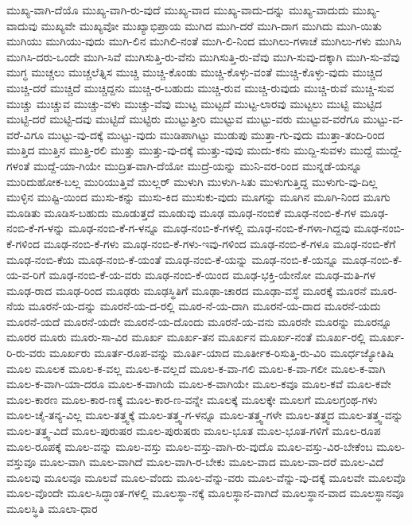 {ಮುಖ್ಯ-ವಾಗಿ-ದೆಯೊ
ಮುಖ್ಯ-ವಾಗಿ-ರು-ವುದೆ
ಮುಖ್ಯ-ವಾದ
ಮುಖ್ಯ-ವಾದು-ದನ್ನು
ಮುಖ್ಯ-ವಾದುದು
ಮುಖ್ಯ-ವಾದುವು
ಮುಖ್ಯವೇ
ಮುಖ್ಯವೋ
ಮುಖ್ಯಾಭಿಪ್ರಾಯ
ಮುಗಿದ
ಮುಗಿ-ದರೆ
ಮುಗಿ-ದಾಗ
ಮುಗಿದು
ಮುಗಿ-ಯಿತು
ಮುಗಿಯು
ಮುಗಿಯು-ವುದು
ಮುಗಿ-ಲಿನ
ಮುಗಿಲಿ-ನಂತೆ
ಮುಗಿ-ಲಿ-ನಿಂದ
ಮುಗಿಲು-ಗಳಾಚೆ
ಮುಗಿಲು-ಗಳು
ಮುಗಿಸಿ
ಮುಗಿಸಿ-ದರು-ಒಂದೇ
ಮುಗಿ-ಸಿವೆ
ಮುಗಿಸುತ್ತಿ-ರು-ವೆನು
ಮುಗಿಸುತ್ತಿ-ರು-ವೆವು
ಮುಗಿ-ಸುವು-ದಕ್ಕಾಗಿ
ಮುಗಿ-ಸು-ವೆವು
ಮುಗ್ಧ
ಮುಚ್ಚಲು
ಮುಚ್ಚಲೆತ್ನಿಸ
ಮುಚ್ಚಿ
ಮುಚ್ಚಿ-ಕೊಂಡು
ಮುಚ್ಚಿ-ಕೊಳ್ಳು-ವಂತೆ
ಮುಚ್ಚಿ-ಕೊಳ್ಳು-ವುದು
ಮುಚ್ಚಿದ
ಮುಚ್ಚಿ-ದರೆ
ಮುಚ್ಚಿದೆ
ಮುಚ್ಚಿದ್ದನು
ಮುಚ್ಚಿ-ರ-ಬಹುದು
ಮುಚ್ಚಿ-ರುವ
ಮುಚ್ಚಿ-ರುವುದು
ಮುಚ್ಚಿ-ರುವೆ
ಮುಚ್ಚಿ-ಸುವ
ಮುಚ್ಚು
ಮುಚ್ಚುವ
ಮುಚ್ಚು-ವಳು
ಮುಚ್ಚು-ವೆವು
ಮುಟ್ಟ
ಮುಟ್ಟದೆ
ಮುಟ್ಟ-ಲಾರವು
ಮುಟ್ಟಲು
ಮುಟ್ಟಿ
ಮುಟ್ಟಿದ
ಮುಟ್ಟಿ-ದರೆ
ಮುಟ್ಟಿ-ದವು
ಮುಟ್ಟಿದೆ
ಮುಟ್ಟಿರು
ಮುಟ್ಟುತ್ತೀರಿ
ಮುಟ್ಟುವ
ಮುಟ್ಟು-ವರು
ಮುಟ್ಟುವ-ವರೆಗೂ
ಮುಟ್ಟು-ವ-ವರೆ-ವಿಗೂ
ಮುಟ್ಟು-ವು-ದಕ್ಕೆ
ಮುಟ್ಟು-ವುದು
ಮುಡಿಪಾಗಿಟ್ಟು
ಮುಡುಪು
ಮುತ್ತಾ-ಗು-ವುದು
ಮುತ್ತಾ-ತಂದಿ-ರಿಂದ
ಮುತ್ತಿದ
ಮುತ್ತಿನ
ಮುತ್ತಿ-ರಲಿ
ಮುತ್ತು
ಮುತ್ತು-ವು-ದಕ್ಕೆ
ಮುತ್ತು-ವುವು
ಮುದು-ಕನು
ಮುದ್ದಿ-ಸುವಳು
ಮುದ್ದೆ
ಮುದ್ದೆ-ಗಳಂತೆ
ಮುದ್ದೆ-ಯಾ-ಗಿಯೇ
ಮುದ್ರಿತ-ವಾಗಿ-ದೆಯೋ
ಮುದ್ರೆ-ಯನ್ನು
ಮುನಿ-ವರ-ರಿಂದ
ಮುನ್ನಡೆ-ಯನ್ನೂ
ಮುರಿದುಹೋಕ-ಬಲ್ಲ
ಮುರಿಯುತ್ತಿವೆ
ಮುಲ್ಲರ್
ಮುಳುಗಿ
ಮುಳುಗಿ-ಸಿತು
ಮುಳುಗುತ್ತಿದ್ದ
ಮುಳುಗು-ವು-ದಿಲ್ಲ
ಮುಳ್ಳಿನ
ಮುಷ್ಟಿ-ಯಿಂದ
ಮುಸು-ಕನ್ನು
ಮುಸು-ಕಿದ
ಮುಸುಕು-ವುದು
ಮೂಗನ್ನು
ಮೂಗಿನ
ಮೂಗಿ-ನಿಂದ
ಮೂಗು
ಮೂಡಿತು
ಮೂಡಿಸ-ಬಹುದು
ಮೂಡುತ್ತದೆ
ಮೂಡುವು
ಮೂಢ
ಮೂಢ-ನಂಬಿಕೆ
ಮೂಢ-ನಂಬಿ-ಕೆ-ಗಳ
ಮೂಢ-ನಂಬಿ-ಕೆ-ಗ-ಳನ್ನು
ಮೂಢ-ನಂಬಿ-ಕೆ-ಗ-ಳನ್ನೂ
ಮೂಢ-ನಂಬಿ-ಕೆ-ಗಳಲ್ಲಿ
ಮೂಢ-ನಂಬಿ-ಕೆ-ಗಳಾ-ಗಿದ್ದವು
ಮೂಢ-ನಂಬಿ-ಕೆ-ಗಳಿಂದ
ಮೂಢ-ನಂಬಿ-ಕೆ-ಗಳು
ಮೂಢ-ನಂಬಿ-ಕೆ-ಗಳು-ಇವು-ಗಳಿಂದ
ಮೂಢ-ನಂಬಿ-ಕೆ-ಗಳೂ
ಮೂಢ-ನಂಬಿ-ಕೆಗೆ
ಮೂಢ-ನಂಬಿ-ಕೆಯ
ಮೂಢ-ನಂಬಿ-ಕೆ-ಯಂತೆ
ಮೂಢ-ನಂಬಿ-ಕೆ-ಯನ್ನು
ಮೂಢ-ನಂಬಿ-ಕೆ-ಯನ್ನೂ
ಮೂಢ-ನಂಬಿ-ಕೆ-ಯ-ವ-ರಿಗೆ
ಮೂಢ-ನಂಬಿ-ಕೆ-ಯ-ವರು
ಮೂಢ-ನಂಬಿ-ಕೆ-ಯಿಂದ
ಮೂಢ-ಭಕ್ತಿ-ಯೇನೋ
ಮೂಢ-ಮತಿ-ಗಳ
ಮೂಢ-ರಾದ
ಮೂಢ-ರಿಂದ
ಮೂಢರು
ಮೂಢಸ್ಥಿತಿಗೆ
ಮೂಢಾ-ಚಾರದ
ಮೂಢಾ-ವಸ್ಥೆ
ಮೂರಕ್ಕೆ
ಮೂರನೆ
ಮೂರ-ನೆಯ
ಮೂರನೆ-ಯ-ದನ್ನು
ಮೂರನೆ-ಯ-ದ-ರಲ್ಲಿ
ಮೂರ-ನೆ-ಯ-ದಾಗಿ
ಮೂರನೆ-ಯ-ದಾದ
ಮೂರನೆ-ಯದು
ಮೂರನೆ-ಯದೆ
ಮೂರನೆ-ಯದೇ
ಮೂರನೆ-ಯ-ದೊಂದು
ಮೂರನೆ-ಯ-ವನು
ಮೂರನೇ
ಮೂರನ್ನು
ಮೂರನ್ನೂ
ಮೂರರ
ಮೂರು
ಮೂರು-ಸಾ-ವಿರ
ಮೂರ್ಖ
ಮೂರ್ಖ-ತನ
ಮೂರ್ಖನ
ಮೂರ್ಖ-ನಂತೆ
ಮೂರ್ಖ-ರಲ್ಲಿ
ಮೂರ್ಖ-ರಿ-ರು-ವರು
ಮೂರ್ಖರು
ಮೂರ್ತ-ರೂಪ-ವನ್ನು
ಮೂರ್ತಿ-ಯಾದ
ಮೂರ್ತೀಕ-ರಿಸುತ್ತಿ-ರು-ವಿರಿ
ಮೂರ್ಧಜ್ಯೋತಿಷಿ
ಮೂಲ
ಮೂಲಕ
ಮೂಲ-ಕ-ವಲ್ಲ
ಮೂಲ-ಕ-ವಲ್ಲದೆ
ಮೂಲ-ಕ-ವಾ-ಗಲಿ
ಮೂಲ-ಕ-ವಾ-ಗಲೀ
ಮೂಲ-ಕ-ವಾಗಿ
ಮೂಲ-ಕ-ವಾಗಿ-ಯಾ-ದರೂ
ಮೂಲ-ಕ-ವಾಗಿಯೆ
ಮೂಲ-ಕ-ವಾಗಿಯೇ
ಮೂಲ-ಕವೂ
ಮೂಲ-ಕವೆ
ಮೂಲ-ಕವೇ
ಮೂಲ-ಕಾರಣ
ಮೂಲ-ಕಾರ-ಣಕ್ಕೆ
ಮೂಲ-ಕಾರ-ಣ-ವನ್ನೇ
ಮೂಲಕ್ಕೆ
ಮೂಲಕ್ಕೇ
ಮೂಲಗೆ
ಮೂಲಗ್ರಂಥ-ಗಳು
ಮೂಲ-ಚೈ-ತನ್ಯ-ವಿಲ್ಲ
ಮೂಲ-ತತ್ತ್ವಕ್ಕೆ
ಮೂಲ-ತತ್ತ್ವ-ಗ-ಳನ್ನೂ
ಮೂಲ-ತತ್ತ್ವ-ಗಳೇ
ಮೂಲ-ತತ್ತ್ವದ
ಮೂಲ-ತತ್ತ್ವ-ವನ್ನು
ಮೂಲ-ತತ್ತ್ವ-ವಿದೆ
ಮೂಲ-ಪುರುಷರ
ಮೂಲ-ಪುರುಷರು
ಮೂಲ-ಭೂತ
ಮೂಲ-ಭೂತ-ಗಳಿಗೆ
ಮೂಲ-ರೂಪ
ಮೂಲ-ರೂಪಕ್ಕೆ
ಮೂಲ-ವನ್ನು
ಮೂಲ-ವಸ್ತು
ಮೂಲ-ವಸ್ತು-ವಾಗಿ-ರು-ವುದೊ
ಮೂಲ-ವಸ್ತು-ವಿರ-ಬೇಕೆಂಬ
ಮೂಲ-ವಸ್ತುವೂ
ಮೂಲ-ವಾಗಿ
ಮೂಲ-ವಾಗಿದೆ
ಮೂಲ-ವಾಗಿ-ರ-ಬೇಕು
ಮೂಲ-ವಾದ
ಮೂಲ-ವಾ-ದರೆ
ಮೂಲ-ವಿದೆ
ಮೂಲವು
ಮೂಲವೂ
ಮೂಲವೆ
ಮೂಲ-ವೆಂದು
ಮೂಲ-ವೆನ್ನು-ವರು
ಮೂಲ-ವೆನ್ನು-ವು-ದಕ್ಕೆ
ಮೂಲವೇ
ಮೂಲವೊ
ಮೂಲ-ವೊಂದೇ
ಮೂಲ-ಸಿದ್ಧಾಂತ-ಗಳಲ್ಲಿ
ಮೂಲಸ್ಥಾ-ನಕ್ಕೆ
ಮೂಲಸ್ಥಾನ-ವಾಗಿದೆ
ಮೂಲಸ್ಥಾನ-ವಾದ
ಮೂಲಸ್ಥಾನವೂ
ಮೂಲಸ್ಥಿತಿ
ಮೂಲಾ-ಧಾರ
}
